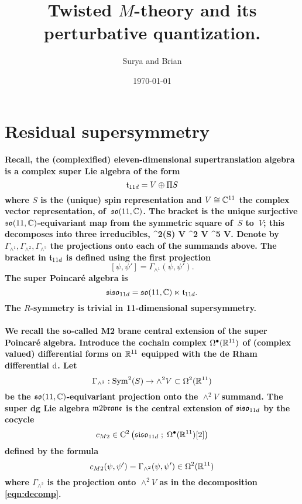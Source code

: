\documentclass[11pt]{amsart}
\author{Surya and Brian}
\date{\today}
\title{Twisted \(M\)-theory and its perturbative quantization.}
\begin{document}
\maketitle

\section{Residual supersymmetry}

\paragraph{
Recall, the (complexified) eleven-dimensional supertranslation algebra is a complex super Lie algebra of the form
\[
  \mathfrak t_{11d} = V \oplus \Pi S
\]
where $S$ is the (unique) spin representation and $V \cong \mathbb C^{11}$ the complex vector representation, of~$\mathfrak{so}(11, \mathbb C)$. 
The bracket is the unique surjective $\mathfrak{so}(11,\mathbb C)$-equivariant map from the symmetric square of~$S$ to~$V$;
this decomposes into three irreducibles, 
\beqn\label{eqn:decomp}
  \Sym^2(S) \cong V \oplus \wedge^2 V \oplus \wedge^5 V.
\eeqn
Denote by $\Gamma_{\wedge^1}, \Gamma_{\wedge^2}, \Gamma_{\wedge^5}$ the projections onto each of the summands above. 
The bracket in $\mathfrak t_{11d}$ is defined using the first projection
\[
[\psi, \psi'] = \Gamma_{\wedge^1} (\psi, \psi') .
\]
The super Poincar\'{e} algebra is
\[
  \mathfrak{siso}_{11d} = \mathfrak{so}(11 , \mathbb C) \ltimes \mathfrak t_{11d} .
\]
The $R$-symmetry is trivial in 11-dimensional supersymmetry. }

\paragraph{
We recall the so-called M2 brane central extension of the super Poincar\'e algebra.
Introduce the cochain complex $\Omega^{\bullet}(\mathbb R^{11})$ of (complex valued) differential forms on $\mathbb R^{11}$ equipped with the de Rham differential ${\rm d}$.  
Let
\[
  \Gamma_{\wedge^2} : \operatorname{Sym}^2(S) \to \wedge^2 V \subset \Omega^2(\mathbb R^{11}) 
\]
be the $\mathfrak{so}(11,\mathbb C)$-equivariant projection onto the $\wedge^2 V$ summand.
The super dg Lie algebra $\m2$ is the central extension of $\mathfrak{siso}_{11d}$ by the cocycle
  \[
    c_{M2} \in {\rm C}^2\left(\mathfrak{siso}_{11d} \; ; \; \Omega^\bullet (\mathbb R^{11})[2]\right)
  \]
  defined by the formula 
  \[c_{M2} (\psi, \psi') = \Gamma_{\wedge^2}(\psi, \psi') \in \Omega^2(\mathbb R^{11})\]
  where $\Gamma_{\wedge^2}$ is the projection onto $\wedge^2 V$ as in the decomposition \eqref{eqn:decomp}. }
\end{document}
